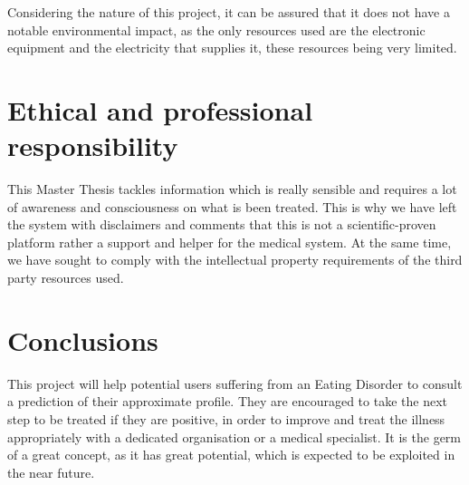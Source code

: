 Considering the nature of this project, it can be assured that it does not have a notable environmental impact, as the only resources used are the electronic equipment and the electricity that supplies it, these resources being very limited.

\section*{Ethical and professional responsibility}

This Master Thesis tackles information which is really sensible and requires a lot of awareness and consciousness on what is been treated. This is why we have left the system with disclaimers and comments that this is not a scientific-proven platform rather a support and helper for the medical system. At the same time, we have sought to comply with the intellectual property requirements of the third party resources used.

\section*{Conclusions}

This project will help potential users suffering from an Eating Disorder to consult a prediction of their approximate profile. They are encouraged to take the next step to be treated if they are positive, in order to improve and treat the illness appropriately with a dedicated organisation or a medical specialist. It is the germ of a great concept, as it has great potential, which is expected to be exploited in the near future.
